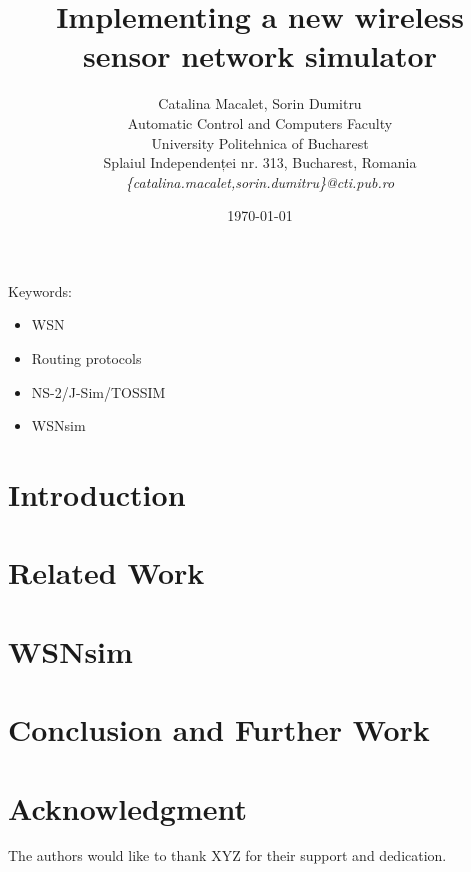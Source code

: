 \documentclass[12pt]{article}
\title{Implementing a new wireless sensor network simulator}
\author{Catalina Macalet, Sorin Dumitru\\
Automatic Control and Computers Faculty\\
University Politehnica of Bucharest\\
Splaiul Independenței nr. 313, Bucharest, Romania \\
\emph{\{catalina.macalet,sorin.dumitru\}@cti.pub.ro}}
\date{\today}
\newcommand{\codename}{WSNsim }
\begin{document}
\maketitle

\begin{abstract}

\end{abstract}

Keywords:
\begin{itemize}
  \item WSN
  \item Routing protocols
  \item NS-2/J-Sim/TOSSIM
  \item \codename
\end{itemize}

\section{Introduction}
\label{sec:introduction}


\section{Related Work}
\label{sec:relatedwork}


\section{\codename}
\label{sec:simulator}


\section{Conclusion and Further Work}
\label{sec:conclusion}


\section*{Acknowledgment}
\label{sec:acknowledgment}

The authors would like to thank XYZ for their support and dedication.



\end{document}
